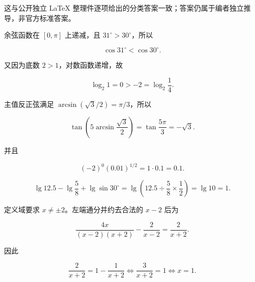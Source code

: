 \begin{answer}
这与公开独立 LaTeX 整理件逐项给出的分类答案一致；答案仍属于编者独立推导，非官方标准答案。


余弦函数在 $[0,\pi]$ 上递减，且 $31^\circ>30^\circ$，所以

\nopagebreak[4]
\[
\cos31^\circ<\cos30^\circ.
\]

又因为底数 $2>1$，对数函数递增，故

\nopagebreak[4]
\[
\log_2 1=0>-2=\log_2\frac14.
\]


主值反正弦满足 $\arcsin(\sqrt3/2)=\pi/3$，所以

\nopagebreak[4]
\[
\tan\left(5\arcsin\frac{\sqrt3}{2}\right)=\tan\frac{5\pi}{3}=-\sqrt3.
\]

并且

\nopagebreak[4]
\[
(-2)^0(0.01)^{1/2}=1\cdot0.1=0.1.
\]


\nopagebreak[4]
\[
\lg12.5-\lg\frac58+\lg\sin30^\circ
=\lg\left(12.5\div\frac58\times\frac12\right)=\lg10=1.
\]


定义域要求 $x\ne\pm2$。左端通分并约去合法的 $x-2$ 后为

\nopagebreak[4]
\[
\frac{4x}{(x-2)(x+2)}-\frac2{x-2}
=\frac{2}{x+2}.
\]

因此

\nopagebreak[4]
\[
\frac2{x+2}=1-\frac1{x+2}
\Longleftrightarrow \frac3{x+2}=1
\Longleftrightarrow x=1.
\]






\end{answer}
